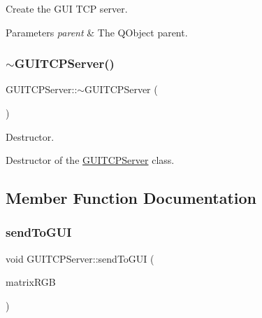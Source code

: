 Create the G\+UI T\+CP server. 


\begin{DoxyParams}{Parameters}
{\em parent} & The Q\+Object parent. \\
\hline
\end{DoxyParams}
\mbox{\label{class_g_u_i_t_c_p_server_a8129a89d3f6775d7d5f01d10745be126}} 
\subsubsection{\texorpdfstring{$\sim$\+G\+U\+I\+T\+C\+P\+Server()}{~GUITCPServer()}}
{\footnotesize\ttfamily G\+U\+I\+T\+C\+P\+Server\+::$\sim$\+G\+U\+I\+T\+C\+P\+Server (\begin{DoxyParamCaption}{ }\end{DoxyParamCaption})}



Destructor. 

Destructor of the \mbox{\hyperlink{class_g_u_i_t_c_p_server}{G\+U\+I\+T\+C\+P\+Server}} class. 

\subsection{Member Function Documentation}
\mbox{\label{class_g_u_i_t_c_p_server_ad7b1dc0a7deda15818913d936b617278}} 
\subsubsection{\texorpdfstring{send\+To\+G\+UI}{sendToGUI}}
{\footnotesize\ttfamily void G\+U\+I\+T\+C\+P\+Server\+::send\+To\+G\+UI (\begin{DoxyParamCaption}\item[{const \mbox{\hyperlink{class_matrix}{Matrix}}$<$ \mbox{\hyperlink{class_r_g_b}{R\+GB}} $>$ \&}]{matrix\+R\+GB }\end{DoxyParamCaption})\hspace{0.3cm}{\ttfamily [signal]}}



